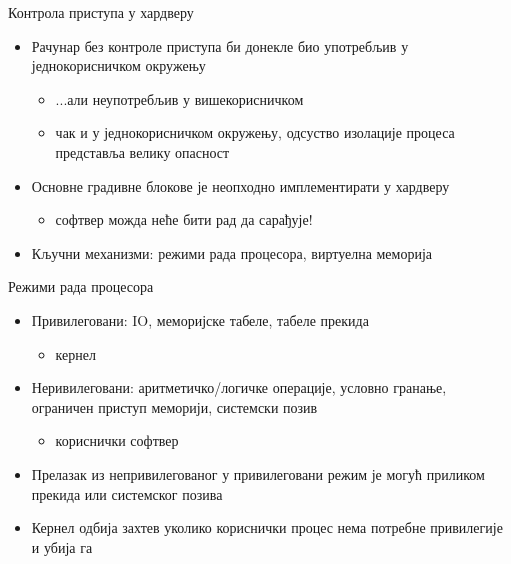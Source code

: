 \documentclass[xcolor=table]{beamer}
\begin{document}
    
    \begin{frame}{Контрола приступа у хардверу}
        \begin{itemize}
            \item Рачунар без контроле приступа би донекле био употребљив у једнокорисничком окружењу
            \begin{itemize}
                \item ...али неупотребљив у вишекорисничком
                \item чак и у једнокорисничком окружењу, одсуство изолације процеса представља велику опасност
            \end{itemize}
            \item Основне градивне блокове је неопходно имплементирати у хардверу
            \begin{itemize}
                \item софтвер можда неће бити рад да сарађује!
            \end{itemize}
            \item Кључни механизми: режими рада процесора, виртуелна меморија
        \end{itemize}
    \end{frame}
    
    \begin{frame}{Режими рада процесора}
        \begin{itemize}
            \item Привилеговани: IO, меморијске табеле, табеле прекида
            \begin{itemize}
                \item кернел
            \end{itemize}
            \item Неривилеговани: аритметичко/логичке операције, условно гранање, ограничен приступ меморији, системски позив
            \begin{itemize}
                \item кориснички софтвер
            \end{itemize}
            \item Прелазак из непривилегованог у привилеговани режим је могућ приликом прекида или системског позива
            \item Кернел одбија захтев уколико кориснички процес нема потребне привилегије и убија га
        \end{itemize}
    \end{frame}
    
\end{document}
